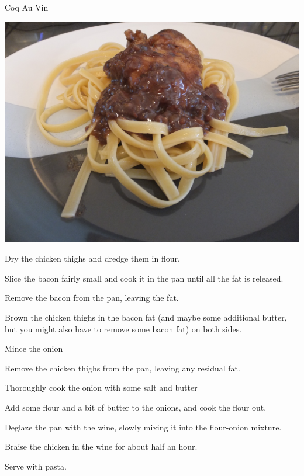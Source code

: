 \documentclass{recipe}
\begin{document}
\begin{recipe}{Coq Au Vin}

  \begin{ingredients}
  \end{ingredients}

  \begin{images}
    \begin{image}
      \includegraphics[width=\linewidth]{coq_a_vin-01.jpeg}
    \end{image}
  \end{images}

  \begin{steps}
  \item Dry the chicken thighs and dredge them in flour.
  \item Slice the bacon fairly small and cook it in the pan until all
    the fat is released.
  \item Remove the bacon from the pan, leaving the fat.
  \item Brown the chicken thighs in the bacon fat (and maybe some
    additional butter, but you might also have to remove some bacon
    fat) on both sides.
  \item Mince the onion
  \item Remove the chicken thighs from the pan, leaving any residual
    fat.
  \item Thoroughly cook the onion with some salt and butter
  \item Add some flour and a bit of butter to the onions, and cook the
    flour out.
  \item Deglaze the pan with the wine, slowly mixing it into the
    flour-onion mixture.
  \item Braise the chicken in the wine for about half an hour.
  \item Serve with pasta.
  \end{steps}


\end{recipe}
\end{document}

